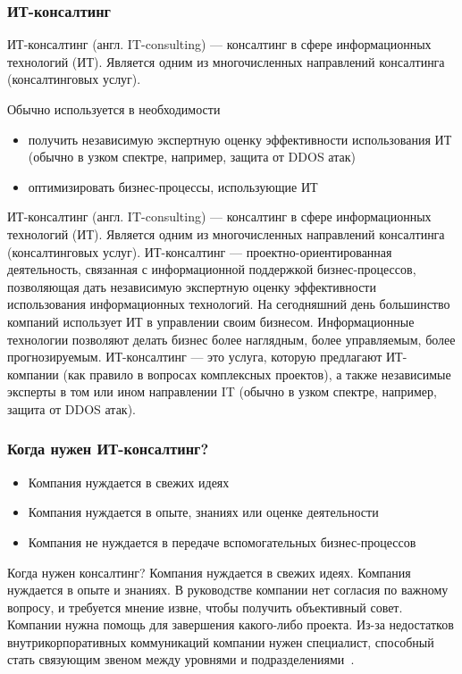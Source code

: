 \documentclass{../industrial-development}
\begin{document}
\begin{frame} \frametitle{ИТ-консалтинг}
\begin{block}{}
\alert{ИТ-консалтинг}  (англ. IT-consulting) — консалтинг в сфере информационных технологий (ИТ). Является одним из многочисленных направлений консалтинга (консалтинговых услуг).
\end{block}
Обычно используется в необходимости
\begin{itemize}
	\item получить независимую экспертную оценку эффективности использования ИТ (обычно в узком спектре, например, защита от DDOS атак)
	\item оптимизировать бизнес-процессы, использующие ИТ
\end{itemize}
\end{frame}
\lecturenotes 
ИТ-консалтинг (англ. IT-consulting) — консалтинг в сфере информационных технологий (ИТ). Является одним из многочисленных направлений консалтинга (консалтинговых услуг).
ИТ-консалтинг — проектно-ориентированная деятельность, связанная с информационной поддержкой бизнес-процессов, позволяющая дать независимую экспертную оценку эффективности использования информационных технологий.
На сегодняшний день большинство компаний использует ИТ в управлении своим бизнесом. Информационные технологии позволяют делать бизнес более наглядным, более управляемым, более прогнозируемым.
ИТ-консалтинг — это услуга, которую предлагают ИТ-компании (как правило в вопросах комплексных проектов), а также независимые эксперты в том или ином направлении IT (обычно в узком спектре, например, защита от DDOS атак).



\begin{frame} \frametitle{Когда нужен ИТ-консалтинг?}
\begin{itemize}
	\item Компания нуждается в свежих идеях
	\item Компания нуждается в опыте, знаниях или оценке деятельности
	\item Компания не нуждается в передаче \alert{вспомогательных}  бизнес-процессов
	
\end{itemize}
\end{frame}
\lecturenotes
Когда нужен консалтинг?
Компания нуждается в свежих идеях.
Компания нуждается в опыте и знаниях.
В руководстве компании нет согласия по важному вопросу, и требуется мнение извне, чтобы получить объективный совет.
Компании нужна помощь для завершения какого-либо проекта.
Из-за недостатков внутрикорпоративных коммуникаций компании нужен специалист, способный стать связующим звеном между уровнями и подразделениями~\cite[с.~187]{Phelan}.
\end{document}
